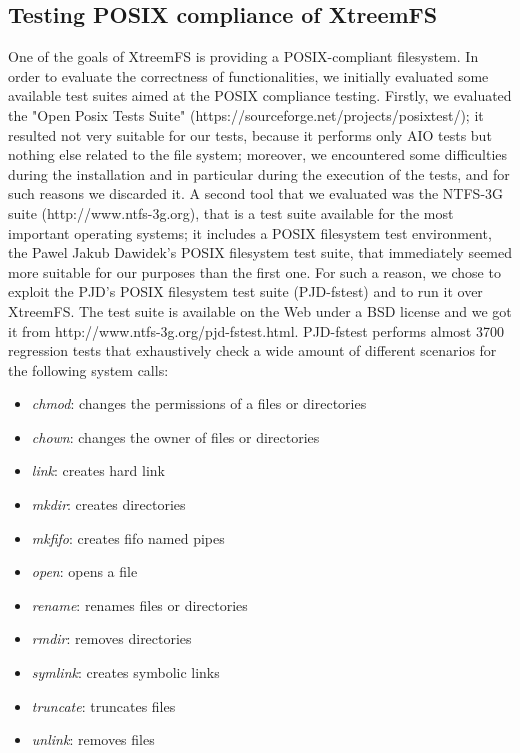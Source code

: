 \subsection{Testing POSIX compliance of XtreemFS}
One of the goals of XtreemFS is providing a POSIX-compliant
filesystem. In order to evaluate the correctness of functionalities,
we initially evaluated some available test suites aimed at the POSIX
compliance testing. Firstly, we evaluated the "Open Posix Tests
Suite" (https://sourceforge.net/projects/posixtest/); it resulted
not very suitable for our tests, because it performs only AIO tests
but nothing else related to the file system; moreover, we
encountered some difficulties during the installation and in
particular during the execution of the tests, and for such reasons
we discarded it. A second tool that we evaluated was the NTFS-3G
suite (http://www.ntfs-3g.org), that is a test suite available for
the most important operating systems; it includes a POSIX filesystem
test environment, the Pawel Jakub Dawidek's POSIX filesystem test
suite, that immediately seemed more suitable for our purposes than
the first one. For such a reason, we chose to exploit the PJD's
POSIX filesystem test suite (PJD-fstest) and to run it over
XtreemFS. The test suite is available on the Web under a BSD license
and we got it from http://www.ntfs-3g.org/pjd-fstest.html.
PJD-fstest performs almost 3700 regression tests that exhaustively
check a wide amount of different scenarios for the following system
calls:
\begin{itemize}
\item \textit{chmod}: changes the permissions of a files or directories
\item \textit{chown}: changes the owner of files or directories
\item \textit{link}: creates hard link
\item \textit{mkdir}: creates directories
\item \textit{mkfifo}: creates fifo named pipes
\item \textit{open}: opens a file
\item \textit{rename}: renames files or directories
\item \textit{rmdir}: removes directories
\item \textit{symlink}: creates symbolic links
\item \textit{truncate}: truncates files
\item \textit{unlink}: removes files
\end{itemize}

